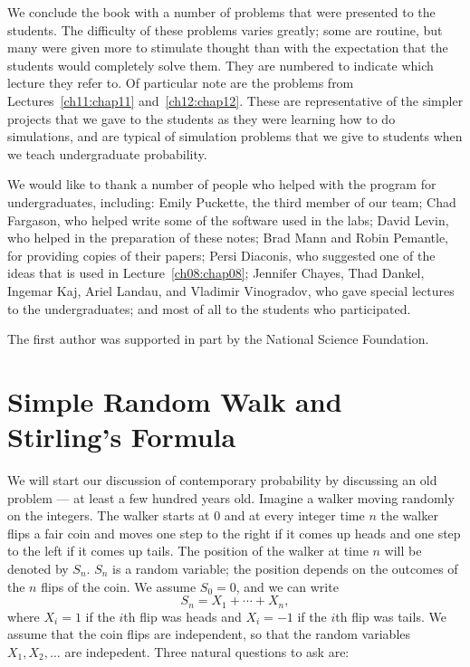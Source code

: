 \documentclass{stml-l}
\theoremstyle{definition}
\numberwithin{equation}{chapter}
\numberwithin{figure}{chapter}
\numberwithin{figure}{section}
\begin{document}
We conclude the book with a number of problems that were presented to the students. The difficulty of these problems varies greatly; some are routine, but many were given more to stimulate thought than with the expectation that the students would completely solve them. They are numbered to indicate which lecture they refer to. Of particular note are the problems from Lectures~\ref{ch11:chap11} and~\ref{ch12:chap12}. These are representative of the simpler projects that we gave to the students as they were learning how to do simulations, and are typical of simulation problems that we give to students when we teach undergraduate probability.

We would like to thank a number of people who helped with the program for undergraduates, including: Emily Puckette, the third member of our team; Chad Fargason, who helped write some of the software used in the labs; David Levin, who helped in the preparation of these notes; Brad Mann and Robin Pemantle, for providing copies of their papers; Persi Diaconis, who suggested one of the ideas that is used in Lecture~\ref{ch08:chap08}; Jennifer Chayes, Thad Dankel, Ingemar Kaj, Ariel Landau, and Vladimir Vinogradov, who gave special lectures to the undergraduates; and most of all to the students who participated.

The first author was supported in part by the National Science Foundation.

\mainmatter


\chapter{Simple Random Walk and Stirling's Formula\label{ch01:chap01}}

We will start our discussion of contemporary probability by
discussing an old problem --- at least a few hundred years old.
Imagine a walker moving randomly on the integers. The walker starts
at $0$ and at every integer time $n$ the walker flips a fair coin
and moves one step to the right if it comes up heads and one step to
the left if it comes up tails. The position of the walker at time
$n$ will be denoted by $S_{n}$. $S_{n}$ is a random variable; the
position depends on the outcomes of the $n$ flips of the coin. We
assume $S_{0}=0$, and we can write
\begin{equation*}
S_{n}=X_{1}+\cdots+X_{n},
\end{equation*}
where $X_{i}=1$ if the $i$th flip was heads and $X_{i}=-1$ if the
$i$th flip was tails. We assume that the coin flips are independent,
so that the random variables $X_{1},X_{2},\ldots$ are indepedent.
Three natural questions to ask are:
\end{document}
